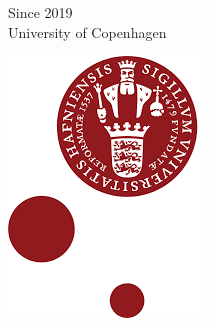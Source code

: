 \documentclass[t,xcolor={svgnames,table}]{beamer}
\begin{document}
\begin{frame}
\begin{minipage}{.7\textwidth}
Since 2019 \\
University of Copenhagen
\end{minipage}
\begin{minipage}{.2\textwidth}
\includegraphics[width=\textwidth]{ku.png}
\end{minipage}
\end{frame}
\end{document}
